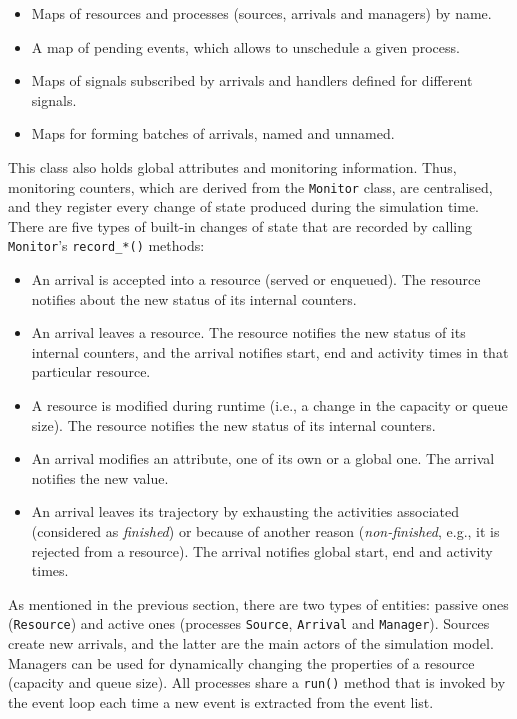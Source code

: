 \documentclass[twoside,nohyper]{tufte-book}
\providecommand{\tightlist}{%
  \setlength{\itemsep}{0pt}\setlength{\parskip}{0pt}}
\theoremstyle{definition}
\theoremstyle{definition}
\theoremstyle{definition}
\theoremstyle{remark}
\begin{document}
\begin{itemize}
\tightlist
\item
  Maps of resources and processes (sources, arrivals and managers) by
  name.
\item
  A map of pending events, which allows to unschedule a given process.
\item
  Maps of signals subscribed by arrivals and handlers defined for
  different signals.
\item
  Maps for forming batches of arrivals, named and unnamed.
\end{itemize}

This class also holds global attributes and monitoring information.
Thus, monitoring counters, which are derived from the \texttt{Monitor}
class, are centralised, and they register every change of state produced
during the simulation time. There are five types of built-in changes of
state that are recorded by calling \texttt{Monitor}'s
\texttt{record\_*()} methods:

\begin{itemize}
\tightlist
\item
  An arrival is accepted into a resource (served or enqueued). The
  resource notifies about the new status of its internal counters.
\item
  An arrival leaves a resource. The resource notifies the new status of
  its internal counters, and the arrival notifies start, end and
  activity times in that particular resource.
\item
  A resource is modified during runtime (i.e., a change in the capacity
  or queue size). The resource notifies the new status of its internal
  counters.
\item
  An arrival modifies an attribute, one of its own or a global one. The
  arrival notifies the new value.
\item
  An arrival leaves its trajectory by exhausting the activities
  associated (considered as \emph{finished}) or because of another
  reason (\emph{non-finished}, e.g., it is rejected from a resource).
  The arrival notifies global start, end and activity times.
\end{itemize}

As mentioned in the previous section, there are two types of entities:
passive ones (\texttt{Resource}) and active ones (processes
\texttt{Source}, \texttt{Arrival} and \texttt{Manager}). Sources create
new arrivals, and the latter are the main actors of the simulation
model. Managers can be used for dynamically changing the properties of a
resource (capacity and queue size). All processes share a \texttt{run()}
method that is invoked by the event loop each time a new event is
extracted from the event list.
\end{document}
